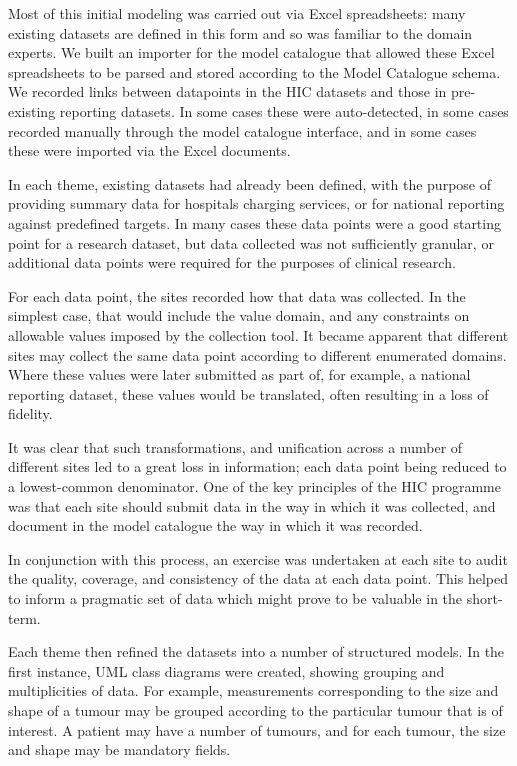 Most of this initial modeling was carried out via Excel spreadsheets:
many existing datasets are defined in this form and so was familiar to
the domain experts.  We built an importer for the model catalogue that
allowed these Excel spreadsheets to be parsed and stored according to
the Model Catalogue schema.  We recorded links between datapoints in
the HIC datasets and those in pre-existing reporting datasets.  In
some cases these were auto-detected, in some cases recorded manually
through the model catalogue interface, and in some cases these were
imported via the Excel documents.  

In each theme, existing datasets had already been defined, with the
purpose of providing summary data for hospitals charging services, or
for national reporting against predefined targets.  In many cases
these data points were a good starting point for a research dataset,
but data collected was not sufficiently granular, or additional
data points were required for the purposes of clinical research.

For each data point, the sites recorded how that data was collected.
In the simplest case, that would include the value domain, and any
constraints on allowable values imposed by the collection tool.  It
became apparent that different sites may collect the same data point
according to different enumerated domains.  Where these values were
later submitted as part of, for example, a national reporting dataset,
these values would be translated, often resulting in a loss of
fidelity.  

It was clear that such transformations, and unification across a
number of different sites led to a great loss in information; each
data point being reduced to a lowest-common denominator.  One of the
key principles of the HIC programme was that each site should submit
data in the way in which it was collected, and document in the model
catalogue the way in which it was recorded.


In conjunction with this process, an exercise was undertaken at each
site to audit the quality, coverage, and consistency of the data at
each data point.  This helped to inform a pragmatic set of data which
might prove to be valuable in the short-term.

Each theme then refined the datasets into a number of structured
models.  In the first instance, UML class diagrams were created,
showing grouping and multiplicities of data.  For example,
measurements corresponding to the size and shape of a tumour may be
grouped according to the particular tumour that is of interest.  A
patient may have a number of tumours, and for each tumour, the size
and shape may be mandatory fields.

